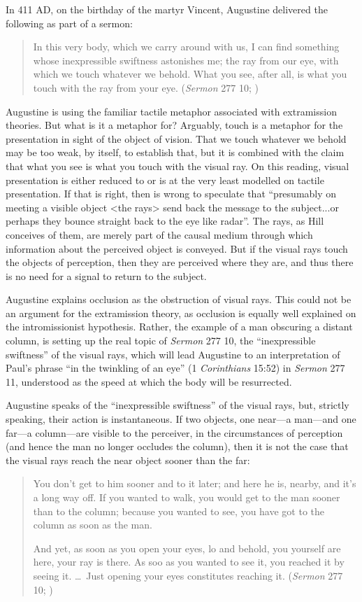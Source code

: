 \documentclass[12pt]{article}
\begin{document}
In 411 AD, on the birthday of the martyr Vincent, Augustine delivered the following as part of a sermon:
\begin{quote}
	In this very body, which we carry around with us, I can find something whose inexpressible swiftness astonishes me; the ray from our eye, with which we touch whatever we behold. What you see, after all, is what you touch with the ray from your eye. (\emph{Sermon} 277 10; \citealt[38]{Hill:1994aa})
\end{quote}
Augustine is using the familiar tactile metaphor associated with extramission theories. But what is it a metaphor for? Arguably, touch is a metaphor for the presentation in sight of the object of vision. That we touch whatever we behold may be too weak, by itself, to establish that, but it is combined with the claim that what you see is what you touch with the visual ray. On this reading, visual presentation is either reduced to or is at the very least modelled on tactile presentation. If that is right, then \citet[46 n.17]{Hill:1994aa} is wrong to speculate that ``presumably on meeting a visible object <the rays> send back the message to the subject...or perhaps they bounce straight back to the eye like radar''. The rays, as Hill conceives of them, are merely part of the causal medium through which information about the perceived object is conveyed. But if the visual rays touch the objects of perception, then they are perceived where they are, and thus there is no need for a signal to return to the subject.

Augustine explains occlusion as the obstruction of visual rays. This could not be an argument for the extramission theory, as occlusion is equally well explained on the intromissionist hypothesis. Rather, the example of a man obscuring a distant column, is setting up the real topic of \emph{Sermon} 277 10, the ``inexpressible swiftness'' of the visual rays, which will lead Augustine to an interpretation of Paul's phrase ``in the twinkling of an eye'' (1 \emph{Corinthians} 15:52) in \emph{Sermon} 277 11, understood as the speed at which the body will be resurrected.

Augustine speaks of the ``inexpressible swiftness'' of the visual rays, but, strictly speaking, their action is instantaneous. If two objects, one near---a man---and one far---a column---are visible to the perceiver, in the circumstances of perception (and hence the man no longer occludes the column), then it is not the case that the visual rays reach the near object sooner than the far: 
\begin{quotation}
	You don't get to him sooner and to it later; and here he is, nearby, and it's a long way off. If you wanted to walk, you would get to the man sooner than to the column; because you wanted to see, you have got to the column as soon as the man. 
	
	And yet, as soon as you open your eyes, lo and behold, you yourself are here, your ray is there. As soo as you wanted to see it, you reached it by seeing it. \ldots\ Just opening your eyes constitutes reaching it. (\emph{Sermon} 277 10; \citealt[39]{Hill:1994aa})
\end{quotation}
\end{document}
